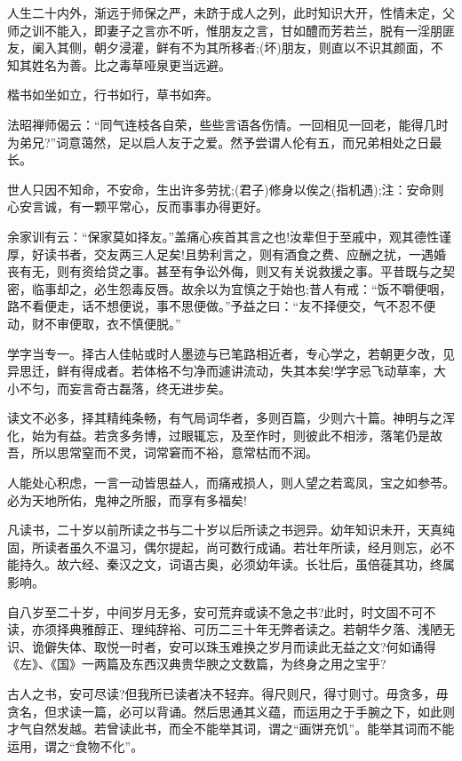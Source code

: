 \documentclass[letterpaper,12pt,english]{sphinxmanual}
\begin{document}
人生二十内外，渐远于师保之严，未跻于成人之列，此时知识大开，性情未定，父师之训不能入，即妻子之言亦不听，惟朋友之言，甘如醴而芳若兰，脱有一淫朋匪友，阑入其侧，朝夕浸灌，鲜有不为其所移者;(坏)朋友，则直以不识其颜面，不知其姓名为善。比之毒草哑泉更当远避。

楷书如坐如立，行书如行，草书如奔。

法昭禅师偈云：“同气连枝各自荣，些些言语各伤情。一回相见一回老，能得几时为弟兄?”词意蔼然，足以启人友于之爱。然予尝谓人伦有五，而兄弟相处之日最长。

世人只因不知命，不安命，生出许多劳扰;(君子)修身以俟之(指机遇);注：安命则心安言诚，有一颗平常心，反而事事办得更好。

余家训有云：“保家莫如择友。”盖痛心疾首其言之也!汝辈但于至戚中，观其德性谨厚，好读书者，交友两三人足矣!且势利言之，则有酒食之费、应酬之扰，一遇婚丧有无，则有资给贷之事。甚至有争讼外侮，则又有关说救援之事。平昔既与之契密，临事却之，必生怨毒反唇。故余以为宜慎之于始也;昔人有戒：“饭不嚼便咽，路不看便走，话不想便说，事不思便做。”予益之曰：“友不择便交，气不忍不便动，财不审便取，衣不慎便脱。”

学字当专一。择古人佳帖或时人墨迹与已笔路相近者，专心学之，若朝更夕改，见异思迁，鲜有得成者。若体格不匀净而遽讲流动，失其本矣!学字忌飞动草率，大小不匀，而妄言奇古磊落，终无进步矣。

读文不必多，择其精纯条畅，有气局词华者，多则百篇，少则六十篇。神明与之浑化，始为有益。若贪多务博，过眼辄忘，及至作时，则彼此不相涉，落笔仍是故吾，所以思常窒而不灵，词常窘而不裕，意常枯而不润。

人能处心积虑，一言一动皆思益人，而痛戒损人，则人望之若鸾凤，宝之如参苓。必为天地所佑，鬼神之所服，而享有多福矣!

凡读书，二十岁以前所读之书与二十岁以后所读之书迥异。幼年知识未开，天真纯固，所读者虽久不温习，偶尔提起，尚可数行成诵。若壮年所读，经月则忘，必不能持久。故六经、秦汉之文，词语古奥，必须幼年读。长壮后，虽倍蓰其功，终属影响。

自八岁至二十岁，中间岁月无多，安可荒弃或读不急之书?此时，时文固不可不读，亦须择典雅醇正、理纯辞裕、可历二三十年无弊者读之。若朝华夕落、浅陋无识、诡僻失体、取悦一时者，安可以珠玉难换之岁月而读此无益之文?何如诵得《左》、《国》一两篇及东西汉典贵华腴之文数篇，为终身之用之宝乎?

古人之书，安可尽读?但我所已读者决不轻弃。得尺则尺，得寸则寸。毋贪多，毋贪名，但求读一篇，必可以背诵。然后思通其义蕴，而运用之于手腕之下，如此则才气自然发越。若曾读此书，而全不能举其词，谓之“画饼充饥”。能举其词而不能运用，谓之“食物不化”。
\end{document}
